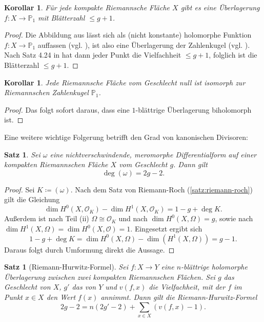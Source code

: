 \documentclass[11pt,a4paper,toc=bibliography]{scrartcl}
\theoremstyle{def}
\theoremstyle{thm}
\newtheorem{satz}[defi]{Satz}
\newtheorem{koro}[defi]{Korollar}
\theoremstyle{remark}
\begin{document}
\begin{koro}
	Für jede kompakte Riemannsche Fläche $X$ gibt es eine Überlagerung \\ $f:X\rightarrow \mathbb{P}_1$ mit Blätterzahl $\leq g+1$.
	\end{koro}
\begin{proof}
	Die Abbildung aus  lässt sich als (nicht konstante) holomorphe Funktion $f:X\rightarrow \mathbb{P}_1$ auffassen (vgl. \cite[~S.8]{forster}), ist also eine Überlagerung der Zahlenkugel (vgl. \cite[~S.18]{forster}). Nach Satz 4.24 in \cite{forster} hat dann jeder Punkt die Vielfachheit $\leq g+1$, folglich ist die Blätterzahl $\leq g+1$.
	
\end{proof}
\begin{koro}
	Jede Riemannsche Fläche vom Geschlecht null ist isomorph zur Riemannschen Zahlenkugel $\mathbb{P}_1$.
\end{koro}
\begin{proof}
Das folgt sofort daraus, dass eine $1$-blättrige Überlagerung biholomorph ist.
\end{proof}
Eine weitere wichtige Folgerung betrifft den Grad von kanonischen Divisoren:
\begin{satz}
	Sei $\omega$ eine nichtverschwindende, meromorphe Differentialform auf einer kompakten Riemannschen Fläche $X$ vom Geschlecht $g$. Dann gilt 
	\[\deg (\omega) = 2g-2.
	\]
\end{satz}
\begin{proof}
		Sei $K\coloneqq (\omega).$ Nach dem Satz von Riemann-Roch (\ref{satz:riemann-roch}) gilt die Gleichung
		\[
		\dim H^0(X,\mathcal{O}_K)-\dim H^1(X,\mathcal{O}_K)=1-g+\deg K.
		\]
		Außerdem ist nach  Teil (ii) $\Omega\cong\mathcal{O}_K$ und nach \cite[17.10]{forster} $\dim H^0(X,\Omega)=g$, sowie nach \cite[17.11]{forster} $\dim H^1(X,\Omega)=\dim H^0(X,\mathcal{O})=1$. Eingesetzt ergibt sich
		\[
		1-g+\deg K = \dim H^0(X,\Omega)-\dim(H^1(X,\Omega))=g-1.
		\]
		Daraus folgt durch Umformung direkt die Aussage.
\end{proof}
\begin{satz}[Riemann-Hurwitz-Formel]
	Sei $f:X\rightarrow Y$ eine $n$-blättrige holomorphe Überlagerung zwischen zwei kompakten Riemannschen Flächen. Sei $g$ das Geschlecht von $X$, $g'$ das von $Y$ und $v(f,x)$ die Vielfachheit, mit der $f$ im Punkt $x\in X$ den Wert $f(x)$ annimmt. Dann gilt die Riemann-Hurwitz-Formel
	\[
	2g-2=n(2g'-2)+\sum_{x\in X}\left(v(f,x)-1\right).
	\]
\end{satz}
\end{document}

